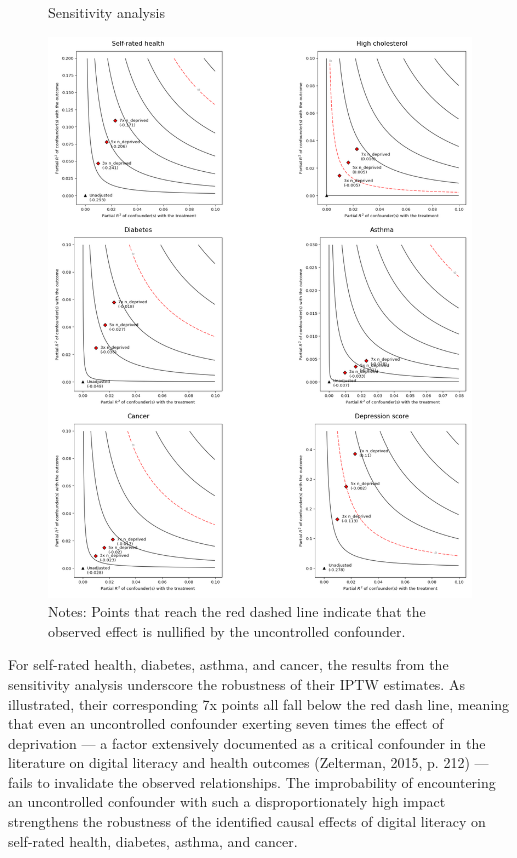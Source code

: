 \begin{figure}
    \centering
    \caption{Sensitivity analysis}
    \label{fig:sense}
    \includegraphics[width=\textwidth]{figures/sensitivity.png}
    \caption*{\footnotesize Notes: Points that reach the red dashed line indicate that the observed effect is nullified by the uncontrolled confounder.}
\end{figure}

For self-rated health, diabetes, asthma, and cancer, the results from the sensitivity analysis underscore the robustness of their IPTW estimates. As illustrated, their corresponding 7x points all fall below the red dash line, meaning that even an uncontrolled confounder exerting seven times the effect of deprivation — a factor extensively documented as a critical confounder in the literature on digital literacy and health outcomes (Zelterman, 2015, p. 212) — fails to invalidate the observed relationships. The improbability of encountering an uncontrolled confounder with such a disproportionately high impact strengthens the robustness of the identified causal effects of digital literacy on self-rated health, diabetes, asthma, and cancer.

